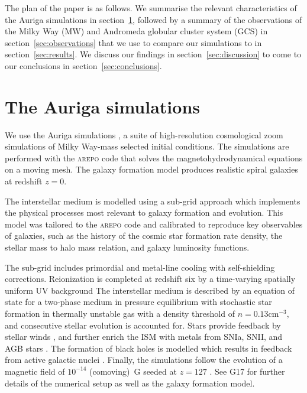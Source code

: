 \documentclass[a4paper,fleqn,usenatbib]{mnras}
\providecommand{\DIFaddend}{} %
\DeclareRobustCommand{\DIFaddend}{\DIFOaddend \let\includegraphics\DIFOincludegraphics} %
\begin{document}
\DIFaddend The plan of the paper is as follows. We summarise the relevant characteristics 
of the Auriga simulations in section~\ref{sec:auriga}, followed by a summary of 
the observations of the Milky Way (MW) and Andromeda globular cluster system (GCS)
in section~\ref{sec:observations} that we use to compare our simulations to in
section~\ref{sec:results}. We discuss our findings in section~\ref{sec:discussion}
to come to our conclusions in section~\ref{sec:conclusions}.


\section{The Auriga simulations}
\label{sec:auriga}
We use the Auriga simulations \citep[][hereafter G17]{2017MNRAS.467..179G}, a
suite of high-resolution cosmological zoom simulations of Milky Way-mass
selected initial conditions. The simulations are performed with the \textsc{arepo} 
\citep{2010MNRAS.401..791S, 2016MNRAS.455.1134P} code that solves the 
magnetohydrodynamical equations on a moving mesh. The galaxy formation model 
produces realistic spiral galaxies at redshift $z=0$.

The interstellar medium is modelled using a sub-grid approach which implements
the physical processes most relevant to galaxy formation and evolution.
This model was tailored to the \textsc{arepo} code and calibrated to reproduce
key observables of galaxies, such as the history of the cosmic star formation rate
density, the stellar mass to halo mass relation, and galaxy luminosity functions.

The sub-grid includes primordial and metal-line cooling with self-shielding
corrections. Reionization is completed at redshift six by a time-varying
spatially uniform UV background \citep{2009ApJ...703.1416F, 2013MNRAS.436.3031V}
The interstellar medium is described by an equation of state for a two-phase medium
in pressure equilibrium \citep{2003MNRAS.339..289S} with stochastic star formation
in thermally unstable gas with a density threshold of $n = 0.13 \text{cm}^{-3}$,
and consecutive stellar evolution is accounted for. Stars provide feedback by
stellar winds \citep{2014MNRAS.437.1750M, 2017MNRAS.467..179G}, and further
enrich the ISM with metals from SNIa, SNII, and AGB stars \citep{2013MNRAS.436.3031V}.
The formation of black holes is modelled which results in feedback from active
galactic nuclei \citep{2005MNRAS.361..776S, 2014MNRAS.437.1750M, 2017MNRAS.467..179G}.
Finally, the simulations follow the evolution of a magnetic field of $10^{-14}$
(comoving)~G seeded at $z = 127$ \citep{2013MNRAS.432..176P, 2014ApJ...783L..20P}.
See G17 for further details of the numerical setup as well as the galaxy formation
model.
\end{document}
